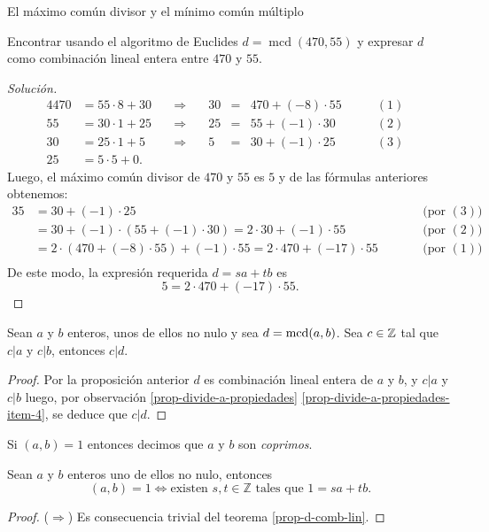 \begin{section}{El máximo común divisor y el mínimo común múltiplo}
\begin{ejemplo*}
    Encontrar usando el algoritmo de Euclides $d = \operatorname{mcd}( 470, 55)$ y expresar $d$  como combinación lineal entera entre  $470$ y $55$.
\end{ejemplo*}
\begin{proof}[Solución]
    \begin{alignat*}4
    470&=55 \cdot 8 +30&\quad\Rightarrow\quad &30 &=&470 + (-8)\cdot 55&\qquad (1)&\\
    55&=30 \cdot 1 + 25&\quad\Rightarrow\quad &25 &=&55 +(-1)\cdot 30&\qquad (2)&\\
    30&=25 \cdot 1+5&\quad\Rightarrow\quad &5 &=&30 +(-1) \cdot 25&\qquad (3)& \\
    25&=5\cdot 5+0.&&&&&&
    \end{alignat*}
    Luego,  el máximo común divisor de $470$ y $55$ es $5$ y de las fórmulas anteriores obtenemos:
    \begin{alignat*}3
    5 &= 30 +(-1) \cdot 25& &\qquad \text{(por $(3)$)} && \\
    &= 30 + (-1) \cdot (55 +(-1)\cdot 30) = 2 \cdot 30 + (-1) \cdot 55& &\qquad \text{(por $(2)$)}&& \\   
    &=  2 \cdot (470 + (-8)\cdot 55) + (-1) \cdot 55 = 2 \cdot 470 +(-17)\cdot 55& &\qquad \text{(por $(1)$)}&&\\    
    \end{alignat*}
    De este modo, la expresión requerida $d=sa+tb$ es
    $$
    5=2 \cdot 470 +(-17)\cdot 55.
    $$
\end{proof}

\begin{corolario}
    Sean  $a$ y $b$ enteros,  unos de ellos no nulo y  sea $d = \operatorname{mcd}(a,b)$. Sea $c \in \mathbb Z$ tal que $c|a$ y $c|b$,  entonces $c|d$. 
\end{corolario}
\begin{proof}
    Por la proposición anterior $d$  es combinación lineal entera de $a$ y $b$, y $c|a$ y $c|b$ luego, por observación \ref{prop-divide-a-propiedades} \ref{prop-divide-a-propiedades-item-4}, se deduce que  $c|d$.
\end{proof}

\begin{definicion}
    Si $(a,b)=1$ entonces decimos que $a$ y $ b$ son \textit{coprimos}.
\end{definicion}


\begin{corolario} Sean $a$ y $b$ enteros uno de ellos no nulo, entonces
    $$
    (a,b) = 1 \Leftrightarrow \text{existen $s,t \in \mathbb Z$ tales que $1 = sa+tb$.}
    $$
\end{corolario}
\begin{proof}
    ($\Rightarrow$) Es consecuencia trivial  del teorema \ref{prop-d-comb-lin}. 
    

\end{proof}
\end{section}
